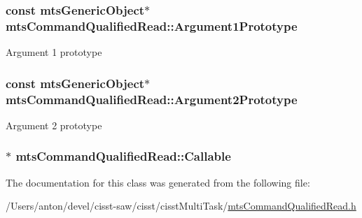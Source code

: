 \subsubsection[{Argument1\+Prototype}]{\setlength{\rightskip}{0pt plus 5cm}const {\bf mts\+Generic\+Object}$\ast$ mts\+Command\+Qualified\+Read\+::\+Argument1\+Prototype\hspace{0.3cm}{\ttfamily [protected]}}\label{classmts_command_qualified_read_a58d58aff10b3c1172c03ac26c5024802}
Argument 1 prototype \hypertarget{classmts_command_qualified_read_a81d40a7ee71e5324beea816f6ec7218b}{}
\subsubsection[{Argument2\+Prototype}]{\setlength{\rightskip}{0pt plus 5cm}const {\bf mts\+Generic\+Object}$\ast$ mts\+Command\+Qualified\+Read\+::\+Argument2\+Prototype\hspace{0.3cm}{\ttfamily [protected]}}\label{classmts_command_qualified_read_a81d40a7ee71e5324beea816f6ec7218b}
Argument 2 prototype \hypertarget{classmts_command_qualified_read_a7579aea578773a341532747fcf77c41c}{}
\subsubsection[{Callable}]{$\ast$ mts\+Command\+Qualified\+Read\+::\+Callable\hspace{0.3cm}{\ttfamily [protected]}}\label{classmts_command_qualified_read_a7579aea578773a341532747fcf77c41c}


The documentation for this class was generated from the following file\+:\begin{DoxyCompactItemize}
\item 
/\+Users/anton/devel/cisst-\/saw/cisst/cisst\+Multi\+Task/\hyperlink{mts_command_qualified_read_8h}{mts\+Command\+Qualified\+Read.\+h}\end{DoxyCompactItemize}
